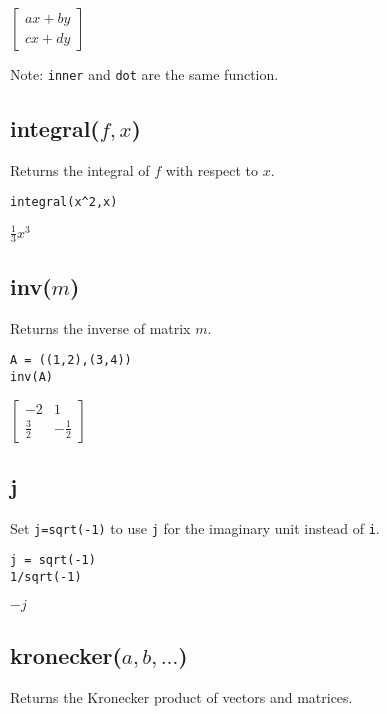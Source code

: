 \noindent
$\displaystyle
\begin{bmatrix}
ax+by
\\[1ex]
cx+dy
\end{bmatrix}
$

\bigskip
\noindent
Note: {\tt inner} and {\tt dot} are the same function.

\subsection*{integral($f,x$)}

Returns the integral of $f$ with respect to $x$.

{\color{blue}
\begin{verbatim}
integral(x^2,x)
\end{verbatim}
}

\noindent
$\displaystyle \tfrac{1}{3}x^3$

\subsection*{inv($m$)}

Returns the inverse of matrix $m$.

{\color{blue}
\begin{verbatim}
A = ((1,2),(3,4))
inv(A)
\end{verbatim}
}

\noindent
$\displaystyle
\begin{bmatrix}
-2 & 1
\\[1ex]
\tfrac{3}{2} & -\tfrac{1}{2}
\end{bmatrix}
$

\subsection*{j}

Set {\tt j=sqrt(-1)} to use {\tt j} for the imaginary unit instead of {\tt i}.

{\color{blue}
\begin{verbatim}
j = sqrt(-1)
1/sqrt(-1)
\end{verbatim}
}

\noindent
$-j$

\subsection*{kronecker($a,b,\ldots$)}

Returns the Kronecker product of vectors and matrices.

